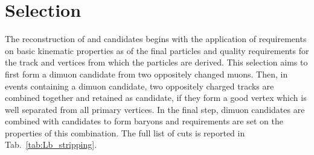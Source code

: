 \chapter{Selection}
\label{sec:Lb_selection}

The reconstruction of \Lb\to\Lz\mm and \Lb\to\jpsi\Lz candidates begins with the application of
requirements on basic kinematic properties as \pt of the final particles and quality requirements
for the track and vertices from which the particles are derived.
This selection aims to first form a dimuon candidate from two oppositely changed muons. 
Then, in events containing a dimuon candidate, two oppositely charged tracks are combined
together and retained as \Lz candidate, if they form a good vertex which is well separated
from all primary vertices. In the final step, dimuon candidates are combined with \Lz candidates to form \Lb
baryons and requirements are set on the properties of this combination. 
The full list of cuts is reported in Tab.~\ref{tab:Lb_stripping}.
%
